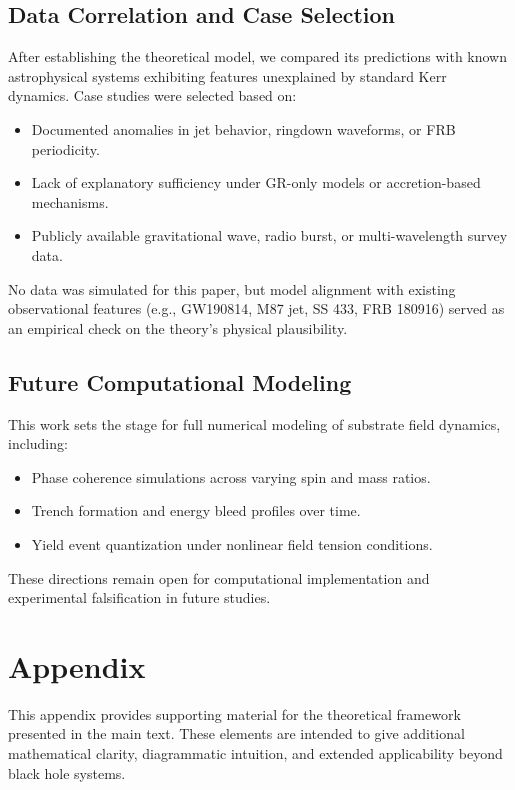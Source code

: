 \documentclass[sn-mathphys]{sn-jnl}
\theoremstyle{thmstyleone}%
\theoremstyle{thmstyletwo}%
\theoremstyle{thmstylethree}%
\begin{document}
\subsection*{Data Correlation and Case Selection}

After establishing the theoretical model, we compared its predictions with known astrophysical systems exhibiting features unexplained by standard Kerr dynamics. Case studies were selected based on:
\begin{itemize}
    \item Documented anomalies in jet behavior, ringdown waveforms, or FRB periodicity.
    \item Lack of explanatory sufficiency under GR-only models or accretion-based mechanisms.
    \item Publicly available gravitational wave, radio burst, or multi-wavelength survey data.
\end{itemize}

No data was simulated for this paper, but model alignment with existing observational features (e.g., GW190814, M87 jet, SS 433, FRB 180916) served as an empirical check on the theory's physical plausibility.

\subsection*{Future Computational Modeling}

This work sets the stage for full numerical modeling of substrate field dynamics, including:
\begin{itemize}
    \item Phase coherence simulations across varying spin and mass ratios.
    \item Trench formation and energy bleed profiles over time.
    \item Yield event quantization under nonlinear field tension conditions.
\end{itemize}

These directions remain open for computational implementation and experimental falsification in future studies.

\pagebreak
\section*{Appendix}

This appendix provides supporting material for the theoretical framework presented in the main text. These elements are intended to give additional mathematical clarity, diagrammatic intuition, and extended applicability beyond black hole systems.
\end{document}
